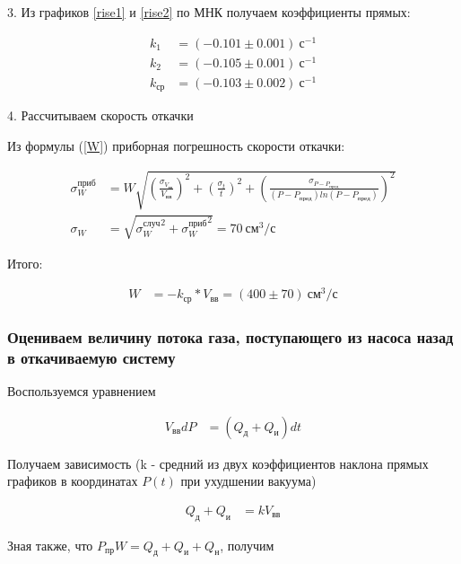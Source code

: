 \documentclass[a4paper, 12pt]{article}
\begin{document}
            3. Из графиков \ref{rise1} и \ref{rise2} по МНК получаем коэффициенты прямых:

            \begin{align*}
                k_1 &= (-0.101 \pm 0.001)~с^{-1}\\
                k_2 &= (-0.105 \pm 0.001)~с^{-1}\\
                k_{ср} &= (-0.103 \pm 0.002)~с^{-1}
            \end{align*}

            4. Рассчитываем скорость откачки

            Из формулы (\ref{W}) приборная погрешность скорости откачки:

            \begin{align*}
                \sigma_W^{приб} &= W \sqrt{\left( \frac{\sigma_{V_{вв}}}{V_{вв}} \right)^2 + \left( \frac{\sigma_{t}}{t} \right)^2 + \left( \frac{\sigma_{P - P_{пред}}}{(P - P_{пред}) ln(P - P_{пред})} \right)^2}\\
                \sigma_W &= \sqrt{{\sigma_W^{случ}}^2 + {\sigma_W^{приб}}^2} = 70~см^3/с
            \end{align*}

            Итого:

            \begin{align*}
                W &= -k_{ср} * V_{вв} = (400 \pm 70)~см^3/с
            \end{align*}

        \subsubsection{Оцениваем величину потока газа, поступающего из насоса назад в откачиваемую систему}

            Воспользуемся уравнением

            \begin{align*}
                V_{вв} dP &= (Q_д + Q_и)dt
            \end{align*}

            Получаем зависимость (k - средний из двух коэффициентов наклона прямых графиков в координатах $P(t)$ при ухудшении вакуума)

            \begin{align*}
                Q_д + Q_и &= k V_{вв}
            \end{align*}

            Зная также, что $P_{пр}W = Q_д + Q_и + Q_н$, получим
\end{document}
